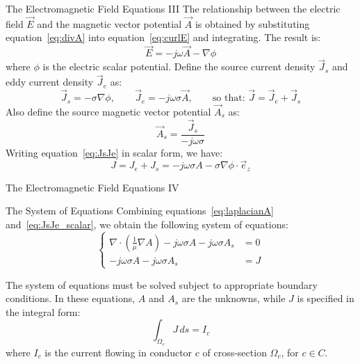 \documentclass[aspectratio=54,xcolor=dvipsnames]{beamer}
\begin{document}
\begin{frame}{The Electromagnetic Field Equations III}
    The relationship between the electric field $\vec{E}$ and the magnetic vector potential $\vec{A}$ is obtained by substituting equation~\eqref{eq:divA} into equation~\eqref{eq:curlE} and integrating. The result is:
    \begin{equation}
        \vec{E} = -j\omega \vec{A} - \nabla \phi \label{eq:E}
    \end{equation}
    where $\phi$ is the electric scalar potential.
    \newline
    Define the source current density $\vec{J}_s$ and eddy current density $\vec{J}_e$ as:
    \begin{equation}
        \vec{J}_s = - \sigma \nabla \phi, \qquad
        \vec{J}_e = - j \omega \sigma \vec{A},  \qquad 
        \text{so that: } \vec{J} = \vec{J}_e + \vec{J}_s \label{eq:JsJe}
    \end{equation}
    Also define the source magnetic vector potential $\vec{A}_s$ as:
    \begin{equation}
        \vec{A}_s =  \frac{\vec{J}_s}{- j \omega \sigma}
    \end{equation}
    Writing equation~\eqref{eq:JsJe} in scalar form, we have: 
    \begin{equation}
        J = J_e + J_s = - j \omega \sigma A - \sigma \nabla \phi \cdot \vec{e}_z \label{eq:JsJe_scalar}
    \end{equation}
\end{frame}

\begin{frame}{The Electromagnetic Field Equations IV}
    \begin{block}{The System of Equations}
    Combining equations~\eqref{eq:laplacianA} and~\eqref{eq:JsJe_scalar}, we obtain the following system of equations:
    \begin{equation}\label{eq:system_equations}
        \left\{
        \begin{aligned}
            \nabla \cdot \left( \frac{1}{\mu} \nabla A \right) - j\omega \sigma A - j\omega \sigma A_s &= 0 
            \\[1em]
            - j\omega \sigma A - j\omega \sigma A_s &= J 
        \end{aligned}
        \right.
    \end{equation}
    \end{block}
    The system of equations must be solved subject to appropriate boundary conditions. In these equations, $A$ and $A_s$ are the unknowns, while $J$ is specified in the integral form:
    \begin{equation}
        \int_{\Omega_c} J \, ds = I_c
        \label{eq:current_constraint}
    \end{equation}
    where $I_c$ is the current flowing in conductor $c$ of cross-section $\Omega_c$, for $c \in C$.
\end{frame}
\end{document}

